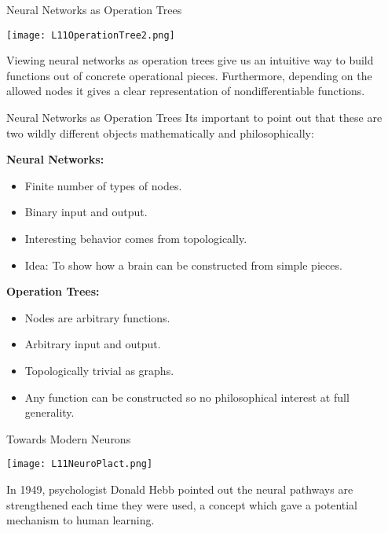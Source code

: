 \documentclass[10pt, table, dvipsnames,xcdraw, handout]{beamer}
\begin{document}
\begin{frame}[fragile]{Neural Networks as Operation Trees}
  \begin{minipage}[t][0.5\textheight][t]{\textwidth}
	\centering \texttt{[image: L11OperationTree2.png]} 
  \end{minipage}
  \vfill
\begin{minipage}[t][0.5\textheight][t]{\textwidth}
Viewing neural networks as operation trees give us an intuitive way to build functions out of concrete operational pieces. Furthermore, depending on the allowed nodes it gives a clear representation of nondifferentiable functions.
\end{minipage}
\end{frame}



\begin{frame}[fragile]{Neural Networks as Operation Trees}
Its important to point out that these are two wildly different objects mathematically and philosophically:\pause

\textbf{Neural Networks:}
\begin{itemize}
\item[] Finite number of types of nodes.\pause
\item[] Binary input and output.\pause
\item[] Interesting behavior comes from topologically.\pause
\item[] Idea: To show how a brain can be constructed from simple pieces. \pause
\end{itemize}
\textbf{Operation Trees:}\pause
\begin{itemize}
\item[] Nodes are arbitrary functions.\pause
\item[] Arbitrary input and output.\pause
\item[] Topologically trivial as graphs.\pause
\item[] Any function can be constructed so no philosophical interest at full generality. \pause
\end{itemize}
\end{frame}





\begin{frame}[fragile]{Towards Modern Neurons}
  \begin{minipage}[t][0.5\textheight][t]{\textwidth}
	\centering \texttt{[image: L11NeuroPlact.png]} 
  \end{minipage}
  \vfill
\begin{minipage}[t][0.5\textheight][t]{\textwidth}
In 1949, psychologist Donald Hebb pointed out the neural pathways are strengthened each time they were used, a concept which gave a potential mechanism to human learning.
\end{minipage}
\end{frame}
\end{document}
